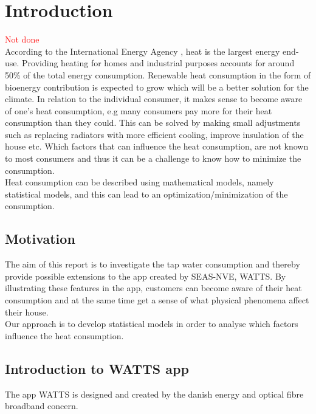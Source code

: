 \chapter{Introduction}
\textcolor{red}{Not done} \\

\noindent According to the International Energy Agency \cite{iea}, heat is the largest energy end-use. Providing heating for homes and industrial purposes accounts for around 50\% of the total energy consumption. Renewable heat consumption in the form of bioenergy contribution is expected to grow which will be a better solution for the climate. In relation to the individual consumer, it makes sense to become aware of one's heat consumption, e.g many consumers pay more for their heat consumption than they could. This can be solved by making small adjustments such as replacing radiators with more efficient cooling, improve insulation of the house etc. Which factors that can influence the heat consumption, are not known to most consumers and thus it can be a challenge to know how to minimize the consumption. \\

\noindent Heat consumption can be described using mathematical models, namely statistical models, and this can lead to an optimization/minimization of the consumption.


\section{Motivation}
The aim of this report is to investigate the tap water consumption and thereby provide possible extensions to the app created by SEAS-NVE, WATTS. By illustrating these features in the app, customers can become aware of their heat consumption and at the same time get a sense of what physical phenomena affect their house. \\

\noindent Our approach is to develop statistical models in order to analyse which factors influence the heat consumption.

\section{Introduction to WATTS app}
The app WATTS is designed and created by the danish energy and optical fibre broadband concern. 